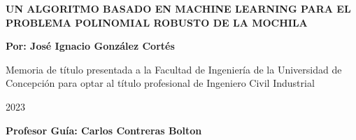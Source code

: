 \documentclass[spanish, a4paper, 12pt, openany,final]{book}
\begin{document}
\def\biblio{}   %

\begin{titlepage}
	
	
	\thispagestyle{frontpage}
	
	\begin{center}
		
		\vspace*{4\baselineskip}
		
		
		{\Huge \textbf{UN ALGORITMO BASADO EN MACHINE LEARNING PARA EL PROBLEMA POLINOMIAL ROBUSTO DE LA MOCHILA\\}}
		\vspace*{1.5\baselineskip}
		
		
		\vspace*{1,5\baselineskip}
		
		\large{\textbf{Por: José Ignacio González Cortés}}\\
		
		\vspace{1,5\baselineskip}
		
		\large{Memoria de título presentada a la Facultad de Ingeniería de la Universidad de Concepción para optar al título profesional de Ingeniero Civil Industrial} 
		
		\vspace{1,5\baselineskip}
		\DTMspanishMonthname{\month} 2023  \\
		\vspace{1,5\baselineskip}
		
		\large{\textbf{Profesor Guía: Carlos Contreras Bolton}}\\
		
	\end{center}
	
	\vspace*{4\baselineskip}
	
\end{titlepage}


\vfill

\end{document}
